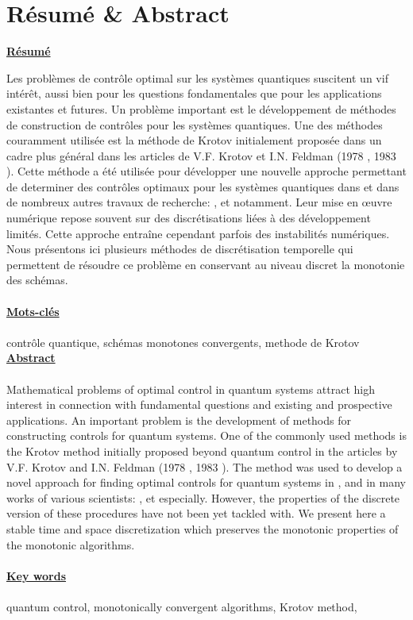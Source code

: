 \chapter*{Résumé \& Abstract}
\Large
\begin{flushleft}
\textbf{\underline{Résumé}}
\end{flushleft}
\normalsize
Les problèmes de contrôle optimal sur les systèmes quantiques suscitent un vif intérêt, aussi bien pour les questions fondamentales que pour les applications existantes et futures. Un problème important est le développement de méthodes de construction de contrôles pour les systèmes quantiques. Une des méthodes couramment utilisée est la méthode de Krotov initialement proposée dans un cadre plus général dans les articles de V.F. Krotov et I.N. Feldman (1978 \cite{Krotov1}, 1983 \cite{Krotov2}). Cette méthode a été utilisée pour développer une nouvelle approche permettant de determiner des contrôles optimaux pour les systèmes quantiques dans \cite{Tannor} et dans de nombreux autres travaux de recherche: \cite{Zhu}, \cite{Maday} et \cite{Salomon} notamment. Leur mise en œuvre numérique repose souvent sur des discrétisations liées à des développement limités. Cette approche entraîne cependant parfois des instabilités numériques. Nous présentons ici plusieurs méthodes de discrétisation temporelle qui permettent de résoudre ce problème en conservant au niveau discret la monotonie des schémas.\\\\
\Large\textbf{\underline{Mots-clés}}\normalsize\\\\
contrôle quantique, schémas monotones convergents, methode de Krotov
\[\]
\Large\textbf{\underline{Abstract}}\\\\\normalsize
Mathematical problems of optimal control in quantum systems attract high interest in connection with fundamental questions and existing and prospective applications. An important problem is the development of methods for constructing controls for quantum systems. One of the commonly used methods is the Krotov method initially proposed beyond quantum control in the articles by V.F. Krotov and I.N. Feldman (1978 \cite{Krotov1}, 1983 \cite{Krotov2}). The method was used to develop a novel approach for finding optimal controls for quantum systems in \cite{Tannor}, and in many works of various scientists: \cite{Zhu}, \cite{Maday} et \cite{Salomon} especially. However, the properties of the discrete version of these procedures have not been yet tackled with.
We present here a stable time and space discretization which preserves the
monotonic properties of the monotonic algorithms.\\\\
\Large\textbf{\underline{Key words}}\normalsize\\\\
quantum control, monotonically convergent algorithms, Krotov method,
